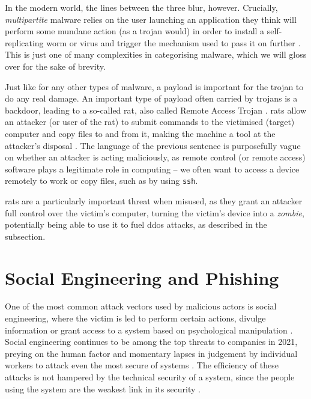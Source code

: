 In the modern world, the lines between the three blur, however. Crucially, \emph{multipartite} malware relies on the
user launching an application they think will perform some mundane action (as a trojan would) in order to install a
self-replicating worm or virus and trigger the mechanism used to pass it on further \cite{viruses-revealed-book}. This
is just one of many complexities in categorising malware, which we will gloss over for the sake of brevity.

Just like for any other types of malware, a payload is important for the trojan to do any real damage. An important type
of payload often carried by trojans is a backdoor, leading to a so-called \acrfull{rat}, also called Remote Access Trojan 
\cite{viruses-revealed-book}. \acrshort{rat}s allow an attacker (or user of the \acrshort{rat}) to submit commands to
the victimised (target) computer and copy files to and from it, making the machine a tool at the attacker's disposal
\cite{viruses-revealed-book}. The language of the previous sentence is purposefully vague on whether an attacker
is acting maliciously, as remote control (or remote access) software plays a legitimate role in computing -- we often
want to access a device remotely to work or copy files, such as by using \verb+ssh+.

\acrshort{rat}s are a particularly important threat when misused, as they grant an attacker full control over the
victim's computer, turning the victim's device into a \emph{zombie}, potentially being able to use it to fuel
\acrshort{ddos} attacks, as described in the  subsection.

\section{Social Engineering and Phishing}
One of the most common attack vectors used by malicious actors is social engineering, 
where the victim is led to perform certain actions, divulge information or grant access to a 
system based on psychological manipulation \cite{advanced-social-engineering-attacks, covid19-social-engineering}. 
Social engineering continues to be among the top threats to companies in 2021, preying on the human
factor and momentary lapses in judgement by individual workers to attack even the most secure of systems
\cite{verizon_2021}. 
The efficiency of these attacks is not hampered by the technical security of a system,
since the people using the system are the weakest link in its security \cite{advanced-social-engineering-attacks,
social-engineering-attacks}.

